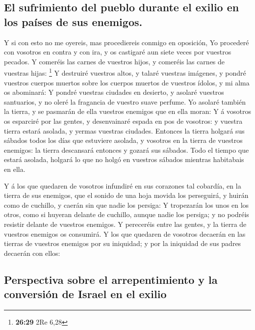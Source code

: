 \hypertarget{el-sufrimiento-del-pueblo-durante-el-exilio-en-los-pauxedses-de-sus-enemigos.}{%
\subsection{El sufrimiento del pueblo durante el exilio en los países de
sus
enemigos.}\label{el-sufrimiento-del-pueblo-durante-el-exilio-en-los-pauxedses-de-sus-enemigos.}}

 Y si con esto no me oyereis, mas procediereis conmigo en
oposición,  Yo procederé con vosotros en contra y con ira,
y os castigaré aun siete veces por vuestros pecados.  Y
comeréis las carnes de vuestros hijos, y comeréis las carnes de vuestras
hijas: \footnote{\textbf{26:29} 2Re 6,28}  Y destruiré
vuestros altos, y talaré vuestras imágenes, y pondré vuestros cuerpos
muertos sobre los cuerpos muertos de vuestros ídolos, y mi alma os
abominará:  Y pondré vuestras ciudades en desierto, y
asolaré vuestros santuarios, y no oleré la fragancia de vuestro suave
perfume.  Yo asolaré también la tierra, y se pasmarán de
ella vuestros enemigos que en ella moran:  Y á vosotros os
esparciré por las gentes, y desenvainaré espada en pos de vosotros: y
vuestra tierra estará asolada, y yermas vuestras ciudades. 
Entonces la tierra holgará sus sábados todos los días que estuviere
asolada, y vosotros en la tierra de vuestros enemigos: la tierra
descansará entonces y gozará sus sábados.  Todo el tiempo
que estará asolada, holgará lo que no holgó en vuestros sábados mientras
habitabais en ella.

 Y á los que quedaren de vosotros infundiré en sus
corazones tal cobardía, en la tierra de sus enemigos, que el sonido de
una hoja movida los perseguirá, y huirán como de cuchillo, y caerán sin
que nadie los persiga:  Y tropezarán los unos en los otros,
como si huyeran delante de cuchillo, aunque nadie los persiga; y no
podréis resistir delante de vuestros enemigos.  Y
pereceréis entre las gentes, y la tierra de vuestros enemigos os
consumirá.  Y los que quedaren de vosotros decaerán en las
tierras de vuestros enemigos por su iniquidad; y por la iniquidad de sus
padres decaerán con ellos:

\hypertarget{perspectiva-sobre-el-arrepentimiento-y-la-conversiuxf3n-de-israel-en-el-exilio}{%
\subsection{Perspectiva sobre el arrepentimiento y la conversión de
Israel en el
exilio}\label{perspectiva-sobre-el-arrepentimiento-y-la-conversiuxf3n-de-israel-en-el-exilio}}

